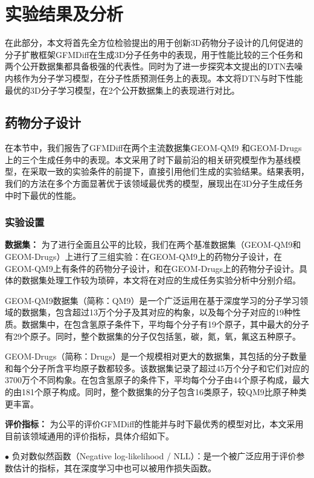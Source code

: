 \chapter{实验结果及分析}
\label{chap:experiment}

在此部分，本文将首先全方位检验提出的用于创新3D药物分子设计的几何促进的分子扩散框架GFMDiff在生成3D分子任务中的表现，用于性能比较的三个任务和两个公开数据集都具备极强的代表性。同时为了进一步探究本文提出的DTN去噪内核作为分子学习模型，在分子性质预测任务上的表现。本文将DTN与时下性能最优的3D分子学习模型，在2个公开数据集上的表现进行对比。

\section{药物分子设计}
在本节中，我们报告了GFMDiff在两个主流数据集GEOM-QM9 \cite{qm9_ramakrishnan_14}和GEOM-Drugs \cite{drugs_axelrod_22}上的三个生成任务中的表现。本文采用了时下最前沿的相关研究模型作为基线模型，在采取一致的实验条件的前提下，直接引用他们生成的实验结果。结果表明，我们的方法在多个方面显著优于该领域最优秀的模型，展现出在3D分子生成任务中时下最优的性能。

\subsection{实验设置}

\textbf{数据集：}
为了进行全面且公平的比较，我们在两个基准数据集（GEOM-QM9和GEOM-Drugs）上进行了三组实验：在GEOM-QM9上的药物分子设计，在GEOM-QM9上有条件的药物分子设计，和在GEOM-Drugs上的药物分子设计。具体的数据集处理工作较为琐碎，本文将在对应的生成任务实验分析中分别介绍。

GEOM-QM9数据集（简称：QM9）是一个广泛运用在基于深度学习的分子学习领域的数据集，包含超过13万个分子及其对应的构象，以及每个分子对应的19种性质。数据集中，在包含氢原子条件下，平均每个分子有19个原子，其中最大的分子有29个原子。同时，整个数据集的分子仅包括氢，碳，氮，氧，氟这五种原子。

GEOM-Drugs（简称：Drugs）是一个规模相对更大的数据集，其包括的分子数量和每个分子所含平均原子数都较多。该数据集记录了超过45万个分子和它们对应的3700万个不同构象。在包含氢原子的条件下，平均每个分子由44个原子构成，最大的由181个原子构成。同时，整个数据集的分子包含16类原子，较QM9比原子种类更丰富。

\textbf{评价指标：}
为公平的评价GFMDiff的性能并与时下最优秀的模型对比，本文采用目前该领域通用的评价指标，具体介绍如下。

$\bullet$ 负对数似然函数（Negative log-likelihood / NLL）：是一个被广泛应用于评价参数估计的指标，其在深度学习中也可以被用作损失函数。

